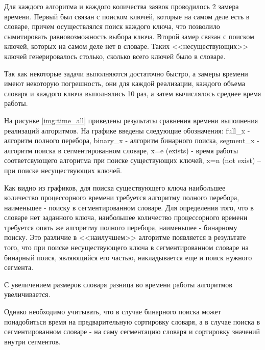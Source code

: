 Для каждого алгоритма и каждого количества заявок проводилось 2 замера времени. Первый был связан с поиском ключей, которые на самом деле есть в словаре, причем осуществлялся поиск каждого ключа, что позволило сымитировать равновозможность выбора ключа. Второй замер связан с поиском ключей, которых на самом деле нет в словаре. Таких <<несуществующих>> ключей генерировалось столько, сколько всего ключей было в словаре.
 
Так как некоторые задачи выполняются достаточно быстро, а замеры времени имеют некоторую погрешность, они для каждой реализации, каждого объема словаря и каждого ключа выполнялись 10 раз, а затем вычислялось среднее время работы.
 

На рисунке \ref{img:time_all} приведены результаты сравнения времени выполнения реализаций алгоритмов. На графике введены следующие обозначения: full\_x - алгоритм полного перебора, binary\_x - алгоритм бинарного поиска, segment\_x - алгоритм поиска в сегментированном словаре, x=e (exists) - время работы соответсвующего алгоритма при поиске существующих ключей, x=n (not exist) -- при поиске несуществующих ключей.

\clearpage
{}

Как видно из графиков, для поиска существующего ключа наибольшее количество процессорного времени требуется алгоритму полного перебора, наименьшее - поиску в сегментированном словаре. Для определения того, что в словаре нет заданного ключа, наибольшее количество процессорного времени требуется опять же алгоритму полного перебора, наименьшее - бинарному поиску. Это различие в <<наилучшем>> алгоритме появляется в результате того, что при поиске несуществующего ключа в сегментированном словаре на бинарный поиск, являющийся его частью, накладывается еще и поиск нужного сегмента.

С увеличением размеров словаря разница во времени работы алгоритмов увеличивается.

Однако необходимо учитывать, что в случае бинарного поиска может понадобиться время на предварительную сортировку словаря, а в случае поиска в сегментированном словаре - на саму сегментацию словаря и сортировку значений внутри сегментов.






